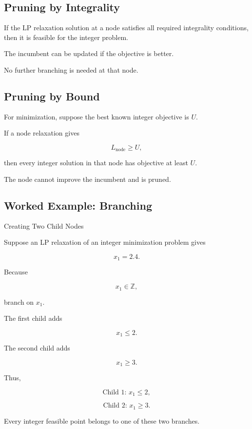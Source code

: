\subsection{Pruning by Integrality}
\label{subsec:pruning-integrality}

If the LP relaxation solution at a node satisfies all required integrality
conditions, then it is feasible for the integer problem.

The incumbent can be updated if the objective is better.

No further branching is needed at that node.

\subsection{Pruning by Bound}
\label{subsec:pruning-bound}

For minimization, suppose the best known integer objective is \(U\).

If a node relaxation gives

\[
\boxed{
L_{\text{node}}\geq U,
}
\]

then every integer solution in that node has objective at least \(U\).

The node cannot improve the incumbent and is pruned.

\subsection{Worked Example: Branching}
\label{subsec:worked-branching}

\begin{workedexamplebox}{Creating Two Child Nodes}

Suppose an LP relaxation of an integer minimization problem gives

\[
x_1=2.4.
\]

Because

\[
x_1\in\mathbb{Z},
\]

branch on \(x_1\).

The first child adds

\[
x_1\leq2.
\]

The second child adds

\[
x_1\geq3.
\]

Thus,

\begin{answerbox}
\[
\boxed{
\text{Child 1: }x_1\leq2,
}
\]

\[
\boxed{
\text{Child 2: }x_1\geq3.
}
\]
\end{answerbox}

Every integer feasible point belongs to one of these two branches.

\end{workedexamplebox}

